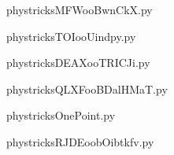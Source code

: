 
    \newcommand{\CaptionFigMFWooBwnCkX}{<+Type your caption here+>}
    \begin{center}
        
    \end{center}
    phystricksMFWooBwnCkX.py

    

    \clearpage
    


    \newcommand{\CaptionFigTOIooUindpy}{<+Type your caption here+>}
    \begin{center}
        
    \end{center}
    phystricksTOIooUindpy.py

    

    \clearpage
    


    \newcommand{\CaptionFigDEAXooTRICJi}{<+Type your caption here+>}
    \begin{center}
        
    \end{center}
    phystricksDEAXooTRICJi.py

    

    \clearpage
    


    \newcommand{\CaptionFigQLXFooBDalHMaT}{<+Type your caption here+>}
    \begin{center}
        
    \end{center}
    phystricksQLXFooBDalHMaT.py

    

    \clearpage
    


    \newcommand{\CaptionFigOnePoint}{<+Type your caption here+>}
    \begin{center}
        
    \end{center}
    phystricksOnePoint.py

    

    \clearpage
    


    \newcommand{\CaptionFigRJDEoobOibtkfv}{<+Type your caption here+>}
    \begin{center}
        
    \end{center}
    phystricksRJDEoobOibtkfv.py

    

    \clearpage
    
